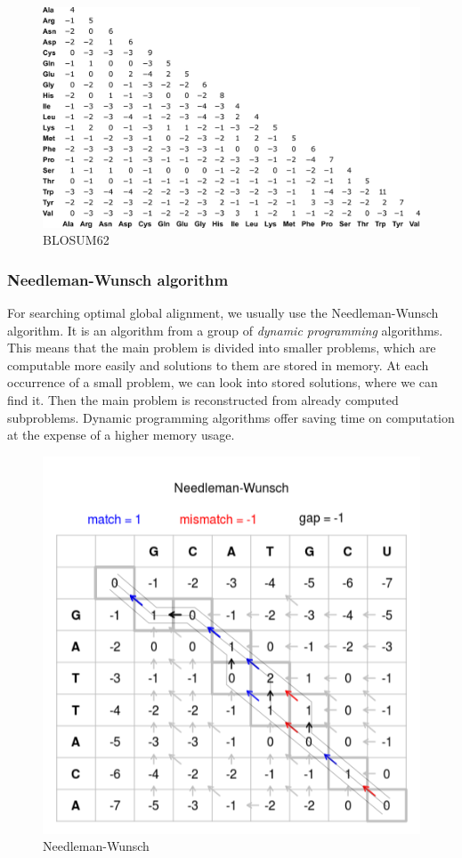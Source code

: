 \begin{figure}[ht]
  \centering
	\includegraphics[width=\textwidth]{./images/blosum62.png}
  \caption{BLOSUM62}
  \label{fig:blosum}
\end{figure}


\subsubsection{Needleman-Wunsch algorithm}
For searching optimal global alignment, we usually use the Needleman-Wunsch algorithm.
It is an algorithm from a group of \emph{dynamic programming} algorithms.
This means that the main problem is divided into smaller problems, which are computable more easily and solutions to them are stored in memory.
At each occurrence of a small problem, we can look into stored solutions, where we can find it.
Then the main problem is reconstructed from already computed subproblems.
Dynamic programming algorithms offer saving time on computation at the expense of a higher memory usage.

\begin{figure}[ht]
  \centering
	\includegraphics[width=\textwidth]{./images/needle_wunsch.png}
  \caption{Needleman-Wunsch}
  \label{fig:glal}
\end{figure}

